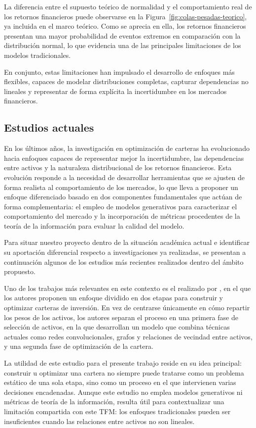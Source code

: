 \documentclass[11pt,a4paper,spanish,oneside]{book}
\numberwithin{equation}{chapter}
\numberwithin{figure}{chapter}
\begin{document}
La diferencia entre el supuesto teórico de normalidad y el comportamiento real de los retornos financieros puede observarse en la Figura~\ref{fig:colas-pesadas-teorico}, ya incluida en el marco teórico. Como se aprecia en ella, los retornos financieros presentan una mayor probabilidad de eventos extremos en comparación con la distribución normal, lo que evidencia una de las principales limitaciones de los modelos tradicionales.

En conjunto, estas limitaciones han impulsado el desarrollo de enfoques más flexibles, capaces de modelar distribuciones completas, capturar dependencias no lineales y representar de forma explícita la incertidumbre en los mercados financieros.

\subsection{Estudios actuales}

En los últimos años, la investigación en optimización de carteras ha evolucionado hacia enfoques capaces de representar mejor la incertidumbre, las dependencias entre activos y la naturaleza distribucional de los retornos financieros. Esta evolución responde a la necesidad de desarrollar herramientas que se ajusten de forma realista al comportamiento de los mercados, lo que lleva a proponer un enfoque diferenciado basado en dos componentes fundamentales que actúan de forma complementaria: el empleo de modelos generativos para caracterizar el comportamiento del mercado y la incorporación de métricas procedentes de la teoría de la información para evaluar la calidad del modelo.

Para situar nuestro proyecto dentro de la situación académica actual e identificar su aportación diferencial respecto a investigaciones ya realizadas, se presentan a continuación algunos de los estudios más recientes realizados dentro del ámbito propuesto.

Uno de los trabajos más relevantes en este contexto es el realizado por \cite{Huang2024}, en el que los autores proponen un enfoque dividido en dos etapas para construir y optimizar carteras de inversión. En vez de centrarse únicamente en cómo repartir los pesos de los activos, los autores separan el proceso en una primera fase de selección de activos, en la que desarrollan un modelo que combina técnicas actuales como redes convolucionales, grafos y relaciones de vecindad entre activos, y una segunda fase de optimización de la cartera.

La utilidad de este estudio para el presente trabajo reside en su idea principal: construir u optimizar una cartera no siempre puede tratarse como un problema estático de una sola etapa, sino como un proceso en el que intervienen varias decisiones encadenadas. Aunque este estudio no emplea modelos generativos ni métricas de teoría de la información, resulta útil para contextualizar una limitación compartida con este TFM: los enfoques tradicionales pueden ser insuficientes cuando las relaciones entre activos no son lineales.
\end{document}
